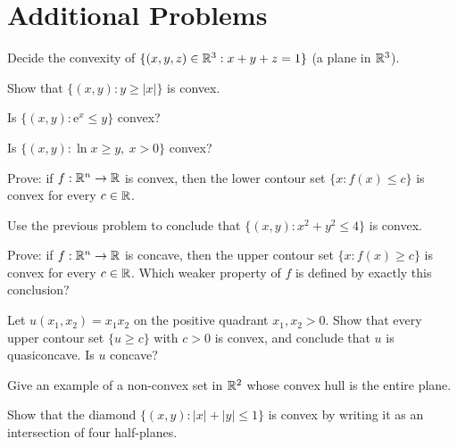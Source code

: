 \section{Additional Problems}

\begin{problems}
  \item Decide the convexity of $\{(x,y,z)\in\mathbb{R}^{3}: x+y+z=1\}$ (a plane in
        $\mathbb{R}^{3}$).
  \item Show that $\{(x,y): y\ge |x|\}$ is convex.
  \item Is $\{(x,y): \mathrm{e}^{x}\le y\}$ convex?
  \item Is $\{(x,y): \ln x\ge y,\ x>0\}$ convex?
  \item Prove: if $f:\mathbb{R}^{n}\to\mathbb{R}$ is convex, then the lower contour set
        $\{x: f(x)\le c\}$ is convex for every $c\in\mathbb{R}$.
  \item Use the previous problem to conclude that
        $\{(x,y): x^{2}+y^{2}\le 4\}$ is convex.
  \item Prove: if $f:\mathbb{R}^{n}\to\mathbb{R}$ is concave, then the upper contour set
        $\{x: f(x)\ge c\}$ is convex for every $c\in\mathbb{R}$. Which weaker
        property of $f$ is defined by exactly this conclusion?
  \item Let $u(x_{1},x_{2})=x_{1}x_{2}$ on the positive quadrant
        $x_{1},x_{2}>0$. Show that every upper contour set
        $\{u\ge c\}$ with $c>0$ is convex, and conclude that $u$ is
        quasiconcave. Is $u$ concave?
  \item Give an example of a non-convex set in $\mathbb{R}^{2}$ whose convex hull
        is the entire plane.
  \item Show that the diamond $\{(x,y): |x|+|y|\le 1\}$ is convex by
        writing it as an intersection of four half-planes.


\end{problems}
